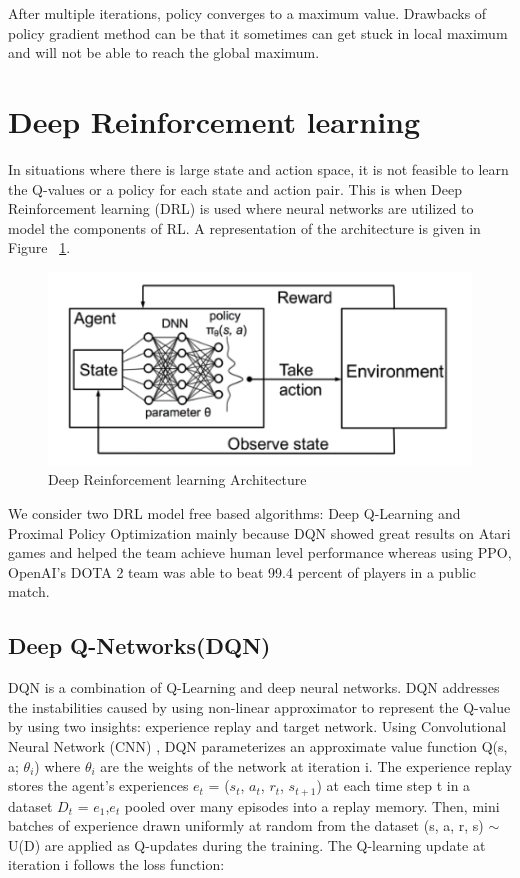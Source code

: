 \documentclass[12pt]{report}
\begin{document}
After multiple iterations, policy converges to a maximum value. Drawbacks of policy gradient method can be that it sometimes can get stuck in local maximum and will not be able to reach the global maximum.  

\section{Deep Reinforcement learning}

In situations where there is large state and action space, it is not feasible to learn the Q-values or a policy for each state and action pair. This is when Deep Reinforcement learning (DRL) is used where neural networks are utilized to model the components of RL. A representation of the architecture is given in Figure ~\ref{fig:DRLArchitecture}. 

\begin{figure}[!h]
    \centering
    \includegraphics[width=12cm]{DRLArchitecture.png}
    \caption{Deep Reinforcement learning Architecture \cite{Mao}}
    \label{fig:DRLArchitecture}
\end{figure}


We consider two DRL model free based algorithms: Deep Q-Learning and Proximal Policy Optimization mainly because DQN showed great results on Atari games and helped the team achieve human level performance whereas using PPO, OpenAI's DOTA 2 team was able to beat 99.4 percent of players in a public match.  \\

\subsection{Deep Q-Networks(DQN)} DQN is a combination of Q-Learning and deep neural networks. DQN addresses the instabilities caused by using non-linear approximator to represent the Q-value by using two insights: experience replay and target network. 
Using Convolutional Neural Network (CNN) , DQN parameterizes an approximate value function Q(s, a; $\theta_i$) where $\theta_i$ are the weights of the network at iteration i. The experience replay stores the agent’s experiences $e_t$ = ($s_t$, $a_t$, $r_t$, $s_{t+1}$) at each time step t in a dataset $D_t$ = $e_1$,$e_t$ pooled over many episodes into a replay
memory. Then, mini batches of experience drawn uniformly at random from the dataset (s, a, r, s) $\sim$ U(D) are applied as Q-updates during the training. The
Q-learning update at iteration i follows the loss function:
\end{document}
